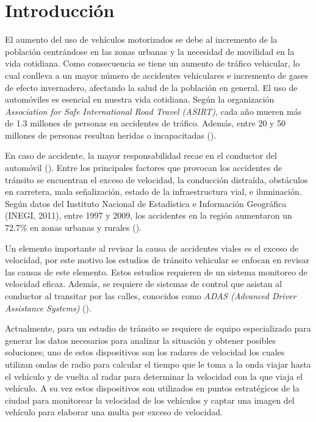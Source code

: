 \chapter{Introducción}

El aumento del uso de vehículos motorizados se debe al incremento de la población centrándose en las zonas urbanas y la necesidad de movilidad en la vida cotidiana. Como consecuencia se tiene un aumento de tráfico vehicular, lo cual conlleva a un mayor número de accidentes vehiculares e incremento de gases de efecto invernadero, afectando la salud de la población en general. El uso de automóviles es esencial en nuestra vida cotidiana. Según la organización \textit{Association for Safe International Road Travel (ASIRT)}, cada año mueren más de 1.3 millones de personas en accidentes de tráfico. Además,  entre 20 y 50 millones de personas resultan heridas o incapacitadas (\cite{zaki2020Traffic}).

En caso de accidente, la mayor responsabilidad recae en el conductor del automóvil (\cite{velazquez2017Siniestralidad}). Entre los principales factores que provocan los accidentes de tránsito se encuentran el exceso de velocidad, la conducción distraída, obstáculos en carretera, mala señalización, estado de la infraestructura vial, e iluminación. Según datos del Instituto Nacional de Estadística e Información Geográfica (INEGI, 2011), entre 1997 y 2009, los accidentes en la región aumentaron un 72.7\% en zonas urbanas y rurales (\cite{carro2019Conductas}).

Un elemento importante al revisar la causa de accidentes viales es el exceso de velocidad, por este motivo los estudios de tránsito vehicular se enfocan en revisar las causas de este elemento. Estos estudios requieren de un sistema monitoreo de velocidad eficaz. Además, se requiere de sistemas de control que asistan al conductor al transitar por las calles, conocidos como \textit{ADAS (Advanced Driver Assistance Systems)} (\cite{carro2019Conductas}).

Actualmente, para un estudio de tránsito se requiere de equipo especializado para generar los datos necesarios para analizar la situación y obtener posibles soluciones; uno de estos dispositivos son los radares de velocidad los cuales utilizan ondas de radio para calcular el tiempo que le toma a la onda viajar hasta el vehículo y de vuelta al radar para determinar la velocidad con la que viaja el vehículo. A su vez estos dispositivos son utilizados en puntos estratégicos de la ciudad para monitorear la velocidad de los vehículos y captar una imagen del vehículo para elaborar una multa por exceso de velocidad.


